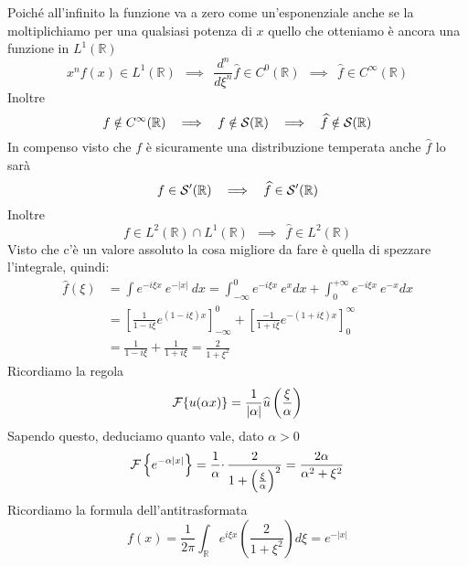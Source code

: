 Poiché all'infinito la funzione va a zero come un'esponenziale anche se la moltiplichiamo per una qualsiasi potenza di $x$ quello che otteniamo è ancora una funzione in $L^{1} (\mathbb{R} )$
\begin{equation*}
x^{n} f(x)\in L^{1} (\mathbb{R} )\ \ \implies \ \ \frac{d^{n}}{d\xi ^{n}}\hat{f} \in C^{0}(\mathbb{R}) \ \ \implies \ \ \hat{f} \in C^{\infty } (\mathbb{R} )
\end{equation*}
Inoltre
\begin{equation*}
f\notin C^{\infty } (\mathbb{R} )\ \ \implies \ \ f\notin \Sc (\mathbb{R}) \ \ \implies \ \ \hat{f} \notin \Sc (\mathbb{R})
\end{equation*}
In compenso visto che $f$ è sicuramente una distribuzione temperata anche $\hat{f}$ lo sarà
\begin{equation*}
f\in \Sc  '(\mathbb{R}) \ \ \implies \ \ \hat{f} \in \Sc  '(\mathbb{R})
\end{equation*}
Inoltre
\begin{equation*}
f\in L^{2}(\mathbb{R}) \cap L^{1}(\mathbb{R}) \ \ \implies \ \ \hat{f} \in L^{2}(\mathbb{R})
\end{equation*}
Visto che c'è un valore assoluto la cosa migliore da fare è quella di spezzare l'integrale, quindi:
\begin{equation*}
\begin{aligned}
\hat{f} (\xi ) & =\int e^{-i\xi x} \ e^{-|x|} \ dx=\int ^{0}_{-\infty } e^{-i\xi x} \ e^{x} dx+\int ^{+\infty }_{0} e^{-i\xi x} \ e^{-x} dx\\
 & =\left[\frac{1}{1-i\xi } e^{( 1-i\xi ) x}\right]^{0}_{-\infty } +\left[\frac{-1}{1+i\xi } e^{-( 1+i\xi ) x}\right]^{\infty }_{0}\\
 & =\frac{1}{1-i\xi } +\frac{1}{1+i\xi } =\frac{2}{1+\xi ^{2}}
\end{aligned}
\end{equation*}
Ricordiamo la regola
\begin{equation*}
\mathcal{F} \{u(\alpha x)\} =\frac{1}{| \alpha | }\widehat{u}\left(\frac{\xi }{\alpha }\right)
\end{equation*}
Sapendo questo, deduciamo quanto vale, dato $\alpha  >0$
\begin{equation*}
\mathcal{F} \left\{e^{-\alpha | x| }\right\} =\frac{1}{\alpha } \cdotp \frac{2}{1+\left(\frac{\xi }{\alpha }\right)^{2}} =\frac{2\alpha }{\alpha ^{2} +\xi ^{2}}
\end{equation*}
Ricordiamo la formula dell'antitrasformata
\begin{equation*}
f( x) =\frac{1}{2\pi }\int _{\mathbb{R}} e^{i\xi x}\left(\frac{2}{1+\xi ^{2}}\right) d\xi =e^{-|x|}
\end{equation*}
